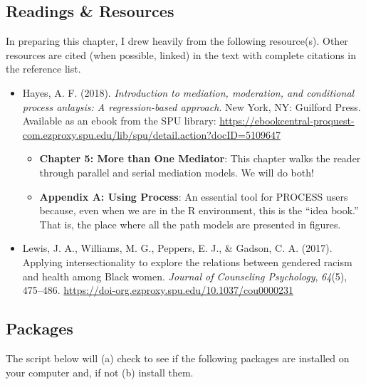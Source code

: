 \documentclass[
  11pt,
]{book}
\providecommand{\tightlist}{%
  \setlength{\itemsep}{0pt}\setlength{\parskip}{0pt}}
\begin{document}
\hypertarget{readings-resources-5}{%
\subsection{Readings \& Resources}\label{readings-resources-5}}

In preparing this chapter, I drew heavily from the following resource(s). Other resources are cited (when possible, linked) in the text with complete citations in the reference list.

\begin{itemize}
\tightlist
\item
  Hayes, A. F. (2018). \emph{Introduction to mediation, moderation, and conditional process anlaysis: A regression-based approach}. New York, NY: Guilford Press. Available as an ebook from the SPU library: \url{https://ebookcentral-proquest-com.ezproxy.spu.edu/lib/spu/detail.action?docID=5109647}

  \begin{itemize}
  \tightlist
  \item
    \textbf{Chapter 5: More than One Mediator}: This chapter walks the reader through parallel and serial mediation models. We will do both!
  \item
    \textbf{Appendix A: Using Process}: An essential tool for PROCESS users because, even when we are in the R environment, this is the ``idea book.'' That is, the place where all the path models are presented in figures.
  \end{itemize}
\item
  Lewis, J. A., Williams, M. G., Peppers, E. J., \& Gadson, C. A. (2017). Applying intersectionality to explore the relations between gendered racism and health among Black women. \emph{Journal of Counseling Psychology}, \emph{64}(5), 475--486. \url{https://doi-org.ezproxy.spu.edu/10.1037/cou0000231}
\end{itemize}

\hypertarget{packages-5}{%
\subsection{Packages}\label{packages-5}}

The script below will (a) check to see if the following packages are installed on your computer and, if not (b) install them.
\end{document}
